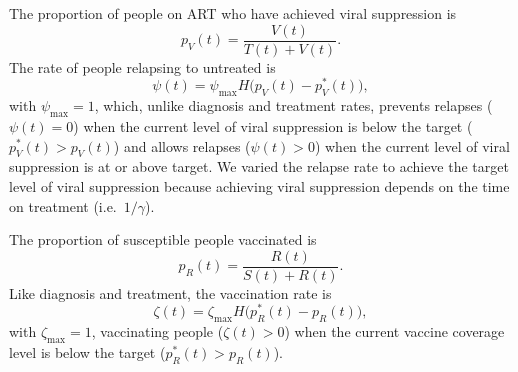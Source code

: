 \documentclass{article}
\begin{document}
The proportion of people on ART who have achieved viral suppression is
\begin{equation}
  p_V(t) = \frac{V(t)}{T(t) + V(t)}.
\end{equation}
The rate of people relapsing to untreated is
\begin{equation}
  \label{relapse_rate}
  \psi(t) = \psi_{\max} H\big(p_V(t) - p_V^*(t)\big),
\end{equation}
with $\psi_{\max} = 1$, which, unlike diagnosis and treatment rates,
prevents relapses ($\psi(t) = 0$) when the current level of viral
suppression is below the target ($p_V^*(t) > p_V(t)$) and allows
relapses ($\psi(t) > 0$) when the current level of viral suppression
is at or above target.  We varied the relapse rate to achieve the
target level of viral suppression because achieving viral suppression
depends on the time on treatment\cite{Currie2009-yz}
(i.e.~$1 / \gamma$).

The proportion of susceptible people vaccinated is
\begin{equation}
  p_R(t) = \frac{R(t)}{S(t) + R(t)}.
\end{equation}
Like diagnosis and treatment, the vaccination rate is
\begin{equation}
  \label{vaccination_rate}
  \zeta(t) = \zeta_{\max} H\big(p_R^*(t) - p_R(t)\big),
\end{equation}
with $\zeta_{\max} = 1$, vaccinating people ($\zeta(t) > 0$) when the
current vaccine coverage level is below the target
($p_R^*(t) > p_R(t)$).
\end{document}
